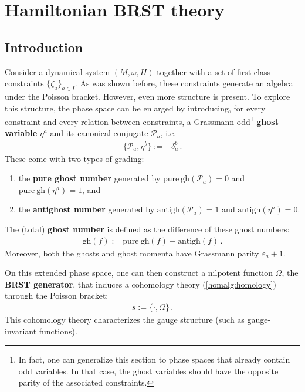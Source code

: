 \section{Hamiltonian BRST theory}\label{section:classical_brst}
\subsection{Introduction}\label{section:brst_introduction}

    Consider a dynamical system $(M,\omega,H)$ together with a set of first-class constraints $\{\zeta_a\}_{a\in I}$. As was shown before, these constraints generate an algebra under the Poisson bracket. However, even more structure is present. To explore this structure, the phase space can be enlarged by introducing, for every constraint and every relation between constraints, a Grassmann-odd\footnote{In fact, one can generalize this section to phase spaces that already contain odd variables. In that case, the ghost variables should have the opposite parity of the associated constraints.} \textbf{ghost variable} $\eta^a$ and its canonical conjugate $\mathcal{P}_a$, i.e.
    \begin{gather}
        \{\mathcal{P}_a,\eta^b\} := -\delta^b_a\,.
    \end{gather}
    These come with two types of grading:
    \begin{enumerate}
        \item the \textbf{pure ghost number} generated by $\mathrm{pure\ gh}(\mathcal{P}_a) = 0$ and $\mathrm{pure\ gh}(\eta^a) = 1$, and
        \item the \textbf{antighost number} generated by $\mathrm{antigh}(\mathcal{P}_a) = 1$ and $\mathrm{antigh}(\eta^a) = 0$.
    \end{enumerate}
    The (total) \textbf{ghost number} is defined as the difference of these ghost numbers:
    \begin{gather}
        \mathrm{gh}(f) := \mathrm{pure\ gh}(f) - \mathrm{antigh}(f)\,.
    \end{gather}
    Moreover, both the ghosts and ghost momenta have Grassmann parity $\varepsilon_a+1$.

    On this extended phase space, one can then construct a nilpotent function $\Omega$, the \textbf{BRST generator}, that induces a cohomology theory (\cref{homalg:homology}) through the Poisson bracket:
    \begin{gather}
        s := \{\cdot,\Omega\}\,.
    \end{gather}
    This cohomology theory characterizes the gauge structure (such as gauge-invariant functions).

